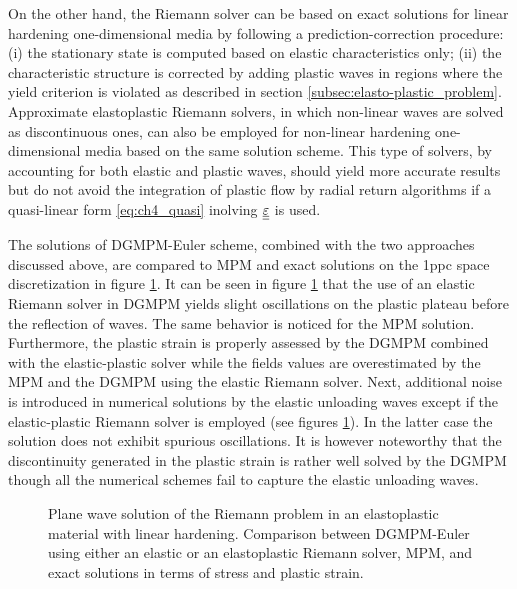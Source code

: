 On the other hand, the Riemann solver can be based on exact solutions for linear hardening one-dimensional media \cite{Thomas_EP,Wang} by following a prediction-correction procedure: (i) the stationary state is computed based on elastic characteristics only; (ii) the characteristic structure is corrected by adding plastic waves in regions where the yield criterion is violated as described in section \ref{subsec:elasto-plastic_problem}.
Approximate elastoplastic Riemann solvers, in which non-linear waves are solved as discontinuous ones, can also be employed for non-linear hardening one-dimensional media based on the same solution scheme.
This type of solvers, by accounting for both elastic and plastic waves, should yield more accurate results but do not avoid the integration of plastic flow by radial return algorithms if a quasi-linear form \eqref{eq:ch4_quasi} inolving ${\underline{\underline{\varepsilon}}}$ is used.

The solutions of DGMPM-Euler scheme, combined with the two approaches discussed above, are compared to MPM and exact solutions on the 1ppc space discretization in figure \ref{fig:RP_EP_dgmpm_mpm}.
It can be seen in figure \ref{fig:RP_EP_dgmpm_mpm} that the use of an elastic Riemann solver in DGMPM yields slight oscillations on the plastic plateau before the reflection of waves.
The same behavior is noticed for the MPM solution.
Furthermore, the plastic strain is properly assessed by the DGMPM combined with the elastic-plastic solver while the fields values are overestimated by the MPM and the DGMPM using the elastic Riemann solver.
Next, additional noise is introduced in numerical solutions by the elastic unloading waves except if the elastic-plastic Riemann solver is employed (see figures \ref{fig:RP_EP_dgmpm_mpm}).
In the latter case the solution does not exhibit spurious oscillations.
It is however noteworthy that the discontinuity generated in the plastic strain is rather well solved by the DGMPM though all the numerical schemes fail to capture the elastic unloading waves.

\begin{figure}[h!]
  \centering
  { \label{subfig:ep_dgmpm_mpm1}}
  { \label{subfig:ep_dgmpm_mpm3}}
  {}
  \caption{Plane wave solution of the Riemann problem in an elastoplastic material with linear hardening. Comparison between DGMPM-Euler using either an elastic or an elastoplastic Riemann solver, MPM, and exact solutions in terms of stress and plastic strain.}
  \label{fig:RP_EP_dgmpm_mpm}
\end{figure}


